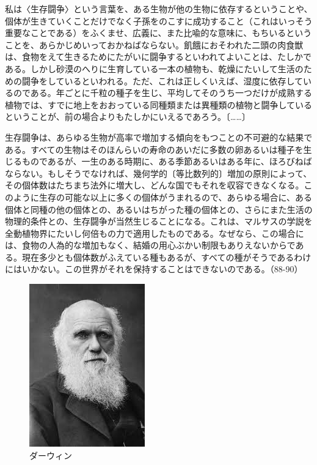 私は〈生存闘争〉という言葉を、ある生物が他の生物に依存するということや、個体が生きていくことだけでなく子孫をのこすに成功すること（これはいっそう重要なことである）をふくませ、広義に、また比喩的な意味に、もちいるということを、あらかじめいっておかねばならない。飢餓におそわれた二頭の肉食獣は、食物をえて生きるためにたがいに闘争するといわれてよいことは、たしかである。しかし砂漠のへりに生育している一本の植物も、乾燥にたいして生活のための闘争をしているといわれる。ただ、これは正しくいえば、湿度に依存しているのである。年ごとに千粒の種子を生じ、平均してそのうち一つだけが成熟する植物では、すでに地上をおおっている同種類または異種類の植物と闘争しているということが、前の場合よりもたしかにいえるであろう。〔……〕

生存闘争は、あらゆる生物が高率で増加する傾向をもつことの不可避的な結果である。すべての生物はそのほんらいの寿命のあいだに多数の卵あるいは種子を生じるものであるが、一生のある時期に、ある季節あるいはある年に、ほろびねばならない。もしそうでなければ、幾何学的〔等比数列的〕増加の原則によって、その個体数はたちまち法外に増大し、どんな国でもそれを収容できなくなる。このように生存の可能な以上に多くの個体がうまれるので、あらゆる場合に、ある個体と同種の他の個体との、あるいはちがった種の個体との、さらにまた生活の物理的条件との、生存闘争が当然生じることになる。これは、マルサスの学説を全動植物界にたいし何倍もの力で適用したものである。なぜなら、この場合には、食物の人為的な増加もなく、結婚の用心ぶかい制限もありえないからである。現在多少とも個体数がふえている種もあるが、すべての種がそうであるわけにはいかない。この世界がそれを保持することはできないのである。（88-90）


  \begin{figure}[htbp]
    \centering
      \includegraphics[width=50mm]{images/darwin.jpg}
      \caption{ダーウィン} 

  \end{figure}



